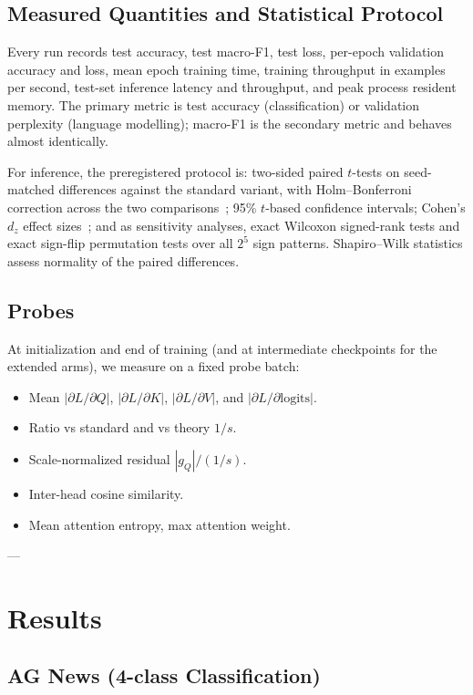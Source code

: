 \documentclass[10pt,a4paper]{article}
\begin{document}
\subsection{Measured Quantities and Statistical Protocol}

Every run records test accuracy, test macro-F1, test loss, per-epoch validation accuracy and loss, mean epoch training time, training throughput in examples per second, test-set inference latency and throughput, and peak process resident memory. The primary metric is test accuracy (classification) or validation perplexity (language modelling); macro-F1 is the secondary metric and behaves almost identically.

For inference, the preregistered protocol is: two-sided paired $t$-tests on seed-matched differences against the standard variant, with Holm--Bonferroni correction across the two comparisons~\cite{holm1979}; 95\% $t$-based confidence intervals; Cohen's $d_z$ effect sizes~\cite{cohen1988}; and as sensitivity analyses, exact Wilcoxon signed-rank tests and exact sign-flip permutation tests over all $2^5$ sign patterns. Shapiro--Wilk statistics assess normality of the paired differences.

\subsection{Probes}

At initialization and end of training (and at intermediate checkpoints for the extended arms), we measure on a fixed probe batch:

\begin{itemize}
  \item Mean $|\partial L/\partial Q|$, $|\partial L/\partial K|$, $|\partial L/\partial V|$, and $|\partial L/\partial \text{logits}|$.
  \item Ratio vs standard and vs theory $1/s$.
  \item Scale-normalized residual $|g_Q| / (1/s)$.
  \item Inter-head cosine similarity.
  \item Mean attention entropy, max attention weight.
\end{itemize}

---

\section{Results}

\subsection{AG News (4-class Classification)}
\end{document}
